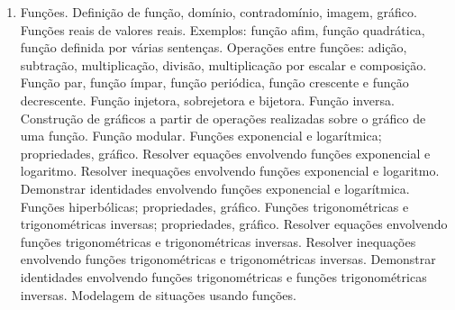\begin{enumerate}
 \item Funções. Definição de função, domínio, contradomínio, imagem, gráfico. Funções reais de valores reais. Exemplos: função afim, função quadrática, função definida por várias sentenças. Operações entre funções: adição, subtração, multiplicação, divisão, multiplicação por escalar e composição. Função par, função ímpar, função periódica, função crescente e função decrescente. Função injetora, sobrejetora e bijetora. Função inversa. Construção de gráficos a partir de operações realizadas sobre o gráfico de uma função. Função modular. Funções exponencial e logarítmica; propriedades, gráfico. Resolver equações envolvendo funções exponencial e logaritmo. Resolver inequações envolvendo funções exponencial e logaritmo. Demonstrar identidades envolvendo funções exponencial e logarítmica. Funções hiperbólicas; propriedades, gráfico. Funções trigonométricas e trigonométricas inversas; propriedades, gráfico. Resolver equações envolvendo funções trigonométricas e trigonométricas inversas. Resolver inequações envolvendo funções trigonométricas e trigonométricas inversas. Demonstrar identidades envolvendo funções trigonométricas e funções trigonométricas inversas. Modelagem de situações usando funções.

\end{enumerate}

